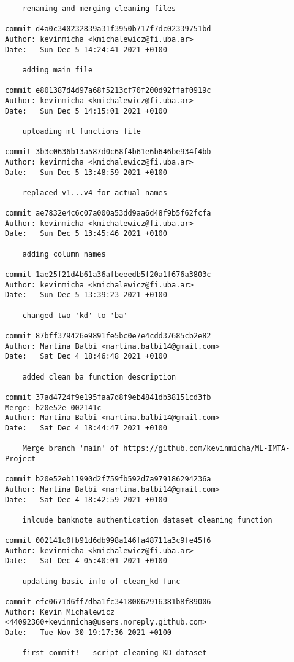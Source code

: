 \documentclass[11pt,a4paper]{article}
\begin{document}
\begin{IMTAannexes}
\begin{verbatim}
    renaming and merging cleaning files

commit d4a0c340232839a31f3950b717f7dc02339751bd
Author: kevinmicha <kmichalewicz@fi.uba.ar>
Date:   Sun Dec 5 14:24:41 2021 +0100

    adding main file

commit e801387d4d97a68f5213cf70f200d92ffaf0919c
Author: kevinmicha <kmichalewicz@fi.uba.ar>
Date:   Sun Dec 5 14:15:01 2021 +0100

    uploading ml functions file

commit 3b3c0636b13a587d0c68f4b61e6b646be934f4bb
Author: kevinmicha <kmichalewicz@fi.uba.ar>
Date:   Sun Dec 5 13:48:59 2021 +0100

    replaced v1...v4 for actual names

commit ae7832e4c6c07a000a53dd9aa6d48f9b5f62fcfa
Author: kevinmicha <kmichalewicz@fi.uba.ar>
Date:   Sun Dec 5 13:45:46 2021 +0100

    adding column names

commit 1ae25f21d4b61a36afbeeedb5f20a1f676a3803c
Author: kevinmicha <kmichalewicz@fi.uba.ar>
Date:   Sun Dec 5 13:39:23 2021 +0100

    changed two 'kd' to 'ba'

commit 87bff379426e9891fe5bc0e7e4cdd37685cb2e82
Author: Martina Balbi <martina.balbi14@gmail.com>
Date:   Sat Dec 4 18:46:48 2021 +0100

    added clean_ba function description

commit 37ad4724f9e195faa7d8f9eb4841db38151cd3fb
Merge: b20e52e 002141c
Author: Martina Balbi <martina.balbi14@gmail.com>
Date:   Sat Dec 4 18:44:47 2021 +0100

    Merge branch 'main' of https://github.com/kevinmicha/ML-IMTA-Project

commit b20e52eb11990d2f759fb592d7a979186294236a
Author: Martina Balbi <martina.balbi14@gmail.com>
Date:   Sat Dec 4 18:42:59 2021 +0100

    inlcude banknote authentication dataset cleaning function

commit 002141c0fb91d6db998a146fa48711a3c9fe45f6
Author: kevinmicha <kmichalewicz@fi.uba.ar>
Date:   Sat Dec 4 05:40:01 2021 +0100

    updating basic info of clean_kd func

commit efc0671d6ff7dba1fc34180062916381b8f89006
Author: Kevin Michalewicz <44092360+kevinmicha@users.noreply.github.com>
Date:   Tue Nov 30 19:17:36 2021 +0100

    first commit! - script cleaning KD dataset


\end{verbatim}
\end{IMTAannexes}
\end{document}
